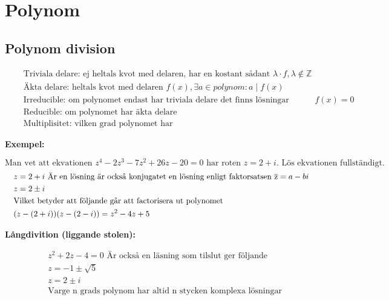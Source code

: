\newpage

\section{Polynom}
\subsection{Polynom division}
\begin{align*}
  &\quad  \text{Triviala delare: ej heltals kvot med delaren, har en kostant sådant } \lambda \cdot f, \lambda \notin \mathbb{Z}  \\
  &\quad  \text{Äkta delare: heltals kvot med delaren } f(x), \exists a \in polynom: a \mid f(x) \\
  &\quad  \text{Irreducible: om polynomet endast har triviala delare det finns lösningar heltaslösningar } f(x)=0 \\
  &\quad  \text{Reducible: om polynomet har äkta delare} \\
  &\quad  \text{Multiplisitet: vilken grad polynomet har}
\end{align*}


\textbf{Exempel:}\par
\begin{equation}
   \text{Man vet att ekvationen } z^4 - 2z^3 - 7z^2 + 26z - 20 = 0 \text{ har roten } z = 2 + i \text{. Lös ekvationen fullständigt.}
\end{equation}
\begin{align*}
  &\quad z = 2 + i \text{ Är en lösning är också konjugatet en lösning enligt faktorsatsen } \overline{\rm z}= a - b i \\
  &\quad z = 2 \pm i \\
  &\quad \text{Vilket betyder att följande går att factorisera ut polynomet} \\
  &\quad (z -(2 + i))(z -(2 - i)) = z^2 - 4z + 5 \\
\end{align*}

\textbf{Långdivition (liggande stolen):}\par
{}
\begin{align*}
  &\quad z^2 + 2z - 4 = 0 \text{ Är också en läsning som tilslut ger följande} \\
  &\quad z = -1 \pm \sqrt{5} \\
  &\quad z = 2 \pm i \\
  &\quad \text{Varge n grads polynom har altid n stycken komplexa lösningar} \\
\end{align*}

